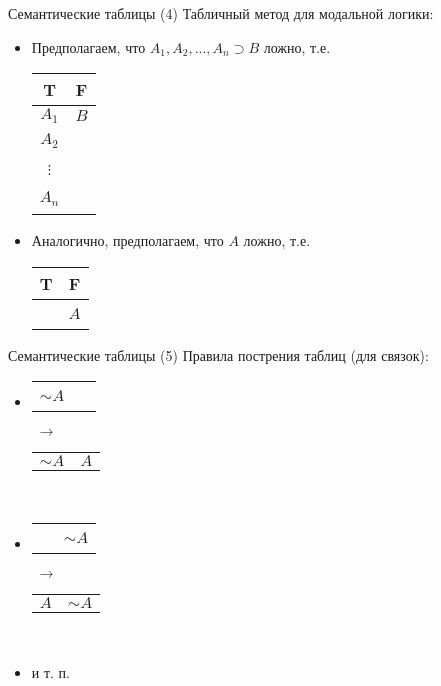 \documentclass{beamer}
\begin{document}
\begin{frame}{Семантические таблицы (4)}
Табличный метод для модальной логики:\\
\bigskip
\begin{itemize}
  \item Предполагаем, что $A_1, A_2, ..., A_n \supset B$ ложно, т.е.
    \begin{table}
      \begin{tabular*}{1.5cm}{c|c}
        T   & F \\ \hline
        $A_1$ & $B$ \\
        $A_2$ & ~ \\
        $\vdots$ & ~ \\
        $A_n$ & ~ \\
      \end{tabular*}
    \end{table}
  \item Аналогично, предполагаем, что $A$ ложно, т.е. 
    \begin{table}
      \begin{tabular*}{1.3cm}{c|c}
        T   & F \\ \hline
        ~ & $A$ \\
      \end{tabular*}
    \end{table}
\end{itemize}
\end{frame}

\begin{frame}{Семантические таблицы (5)}
Правила пострения таблиц (для связок):\\
\bigskip
\begin{itemize}
  \item 
      \begin{tabular}{p{0.75cm}|p{0.75cm}}
        \hline
        $\sim \! A$ & ~ \\
      \end{tabular}
      $\; \to \;$
      \begin{tabular}{p{0.75cm}|p{0.75cm}}
        \hline
        $\sim \! A$ & $A$ \\
      \end{tabular}\\
      \bigskip
  \item 
      \begin{tabular}{p{0.75cm}|p{0.75cm}}
        \hline
        ~ & $\sim \! A$ \\
      \end{tabular}
      $\; \to \;$
      \begin{tabular}{p{0.75cm}|p{0.75cm}}
        \hline
        $A$ & $\sim \! A$ \\
      \end{tabular}\\
      \bigskip
  \item и т. п.
\end{itemize}
\end{frame}
\end{document}

